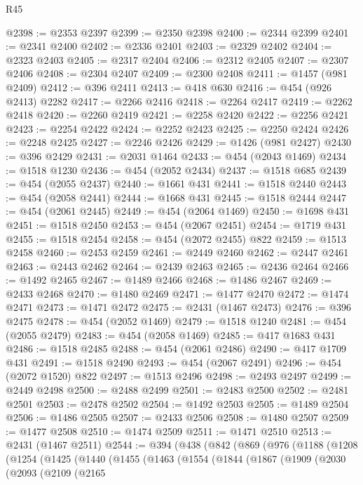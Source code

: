 \begin{lexlean}{R45}
\begin{coremodule}
{{{{{{{{{{{{{{{{{{{{{{{{{{{{{{{{{{{{{{{{{{{{{{{{{{{{{{{{{{{{{{{{{{{{{{{{{{{{{{{{{{{{{{{{{{{@2398 := @2353 @2397
@2399 := @2350 @2398
@2400 := @2344 @2399
@2401 := @2341 @2400
@2402 := @2336 @2401
@2403 := @2329 @2402
@2404 := @2323 @2403
@2405 := @2317 @2404
@2406 := @2312 @2405
@2407 := @2307 @2406
@2408 := @2304 @2407
@2409 := @2300 @2408
@2411 := @1457 (@981 @2409)
@2412 := @396 @2411
@2413 := @418 @630
@2416 := @454 (@926 @2413) @2282
@2417 := @2266 @2416
@2418 := @2264 @2417
@2419 := @2262 @2418
@2420 := @2260 @2419
@2421 := @2258 @2420
@2422 := @2256 @2421
@2423 := @2254 @2422
@2424 := @2252 @2423
@2425 := @2250 @2424
@2426 := @2248 @2425
@2427 := @2246 @2426
@2429 := @1426 (@981 @2427)
@2430 := @396 @2429
@2431 := @2031 @1464
@2433 := @454 (@2043 @1469)
@2434 := @1518 @1230
@2436 := @454 (@2052 @2434)
@2437 := @1518 @685
@2439 := @454 (@2055 @2437)
@2440 := @1661 @431
@2441 := @1518 @2440
@2443 := @454 (@2058 @2441)
@2444 := @1668 @431
@2445 := @1518 @2444
@2447 := @454 (@2061 @2445)
@2449 := @454 (@2064 @1469)
@2450 := @1698 @431
@2451 := @1518 @2450
@2453 := @454 (@2067 @2451)
@2454 := @1719 @431
@2455 := @1518 @2454
@2458 := @454 (@2072 @2455) @822
@2459 := @1513 @2458
@2460 := @2453 @2459
@2461 := @2449 @2460
@2462 := @2447 @2461
@2463 := @2443 @2462
@2464 := @2439 @2463
@2465 := @2436 @2464
@2466 := @1492 @2465
@2467 := @1489 @2466
@2468 := @1486 @2467
@2469 := @2433 @2468
@2470 := @1480 @2469
@2471 := @1477 @2470
@2472 := @1474 @2471
@2473 := @1471 @2472
@2475 := @2431 (@1467 @2473)
@2476 := @396 @2475
@2478 := @454 (@2052 @1469)
@2479 := @1518 @1240
@2481 := @454 (@2055 @2479)
@2483 := @454 (@2058 @1469)
@2485 := @417 @1683 @431
@2486 := @1518 @2485
@2488 := @454 (@2061 @2486)
@2490 := @417 @1709 @431
@2491 := @1518 @2490
@2493 := @454 (@2067 @2491)
@2496 := @454 (@2072 @1520) @822
@2497 := @1513 @2496
@2498 := @2493 @2497
@2499 := @2449 @2498
@2500 := @2488 @2499
@2501 := @2483 @2500
@2502 := @2481 @2501
@2503 := @2478 @2502
@2504 := @1492 @2503
@2505 := @1489 @2504
@2506 := @1486 @2505
@2507 := @2433 @2506
@2508 := @1480 @2507
@2509 := @1477 @2508
@2510 := @1474 @2509
@2511 := @1471 @2510
@2513 := @2431 (@1467 @2511)
@2544 := @394
    (@438
      (@842
        (@869
          (@976
            (@1188
              (@1208
                (@1254
                  (@1425
                    (@1440
                      (@1455
                        (@1463
                          (@1554
                            (@1844
                              (@1867
                                (@1909
                                  (@2030
                                    (@2093
                                      (@2109
                                        (@2165
}}}}}}}}}}}}}}}}}}}}}}}}}}}}}}}}}}}}}}}}}}}}}}}}}}}}}}}}}}}}}}}}}}}}}}}}}}}}}}}}}}}}}}}}}}}
\end{coremodule}
\end{lexlean}
